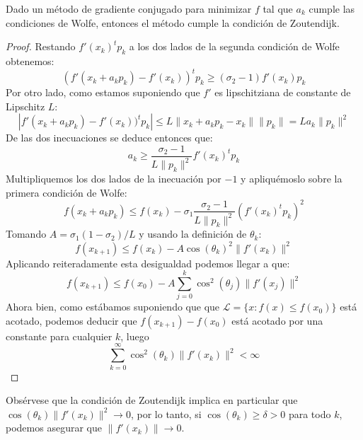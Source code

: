 \begin{theorem}
	Dado un método de gradiente conjugado para minimizar $f$ tal que $a_k$ cumple las condiciones de Wolfe, entonces el método cumple la condición de Zoutendijk.
	
\begin{proof}
	Restando $f'(x_k)^tp_k$ a los dos lados de la segunda condición de Wolfe obtenemos:
	\[ (f'(x_k+a_kp_k) - f'(x_k))^tp_k \geq (\sigma_2 - 1)f'(x_k)p_k \]
	Por otro lado, como estamos suponiendo que $f'$ es lipschitziana de constante de Lipschitz $L$:
	\[ |f'(x_k+a_kp_k) - f'(x_k))^tp_k| \leq L \|x_k+a_kp_k-x_k\| \|p_k\| = L a_k \|p_k\|^2 \]
	De las dos inecuaciones se deduce entonces que:
	\[ a_k \geq \frac{\sigma_2-1}{L\|p_k\|^2} f'(x_k)^tp_k\]
	Multipliquemos los dos lados de la inecuación por $-1$ y apliquémoslo sobre la primera condición de Wolfe:
	\[ f(x_k+a_kp_k) \leq f(x_k) - \sigma_1 \frac{\sigma_2-1}{L\|p_k\|^2} (f'(x_k)^tp_k)^2\]
	Tomando $A=\sigma_1(1-\sigma_2)/L$ y usando la definición de $\theta_k$:
	\[ f(x_{k+1}) \leq f(x_k) - A\cos(\theta_k)^2\|f'(x_k)\|^2 \]
	Aplicando reiteradamente esta desigualdad podemos llegar a que:
	\[ f(x_{k+1}) \leq f(x_0) - A\sum_{j=0}^k \cos^2(\theta_j) \|f'(x_j)\|^2 \]
	Ahora bien, como estábamos suponiendo que que $\mathcal{L}=\{x : f(x)\leq f(x_0)\}$ está acotado, podemos deducir que $f(x_{k+1})-f(x_0)$ está acotado por una constante para cualquier $k$, luego
	\[ \sum_{k=0}^\infty \cos^2(\theta_k)\|f'(x_k)\|^2 < \infty\]
\end{proof}
\end{theorem}
Obsérvese que la condición de Zoutendijk implica en particular que $\cos(\theta_k)\|f'(x_k)\|^2\to 0$, por lo tanto, si $\cos(\theta_k)\geq \delta>0$ para todo $k$, podemos asegurar que $\|f'(x_k)\|\to 0$.

